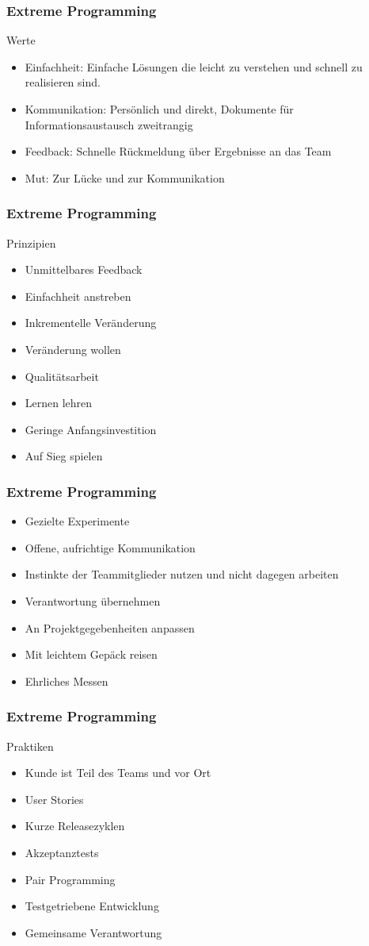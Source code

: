 \begin{frame}
\frametitle{Extreme Programming}
	Werte
	\begin{itemize}
		\item Einfachheit: Einfache Lösungen die leicht zu verstehen und schnell zu realisieren sind.
		\item Kommunikation: Persönlich und direkt, Dokumente für Informationsaustausch zweitrangig
		\item Feedback: Schnelle Rückmeldung über Ergebnisse an das Team
		\item Mut: Zur Lücke und zur Kommunikation
	\end{itemize}
\end{frame}

\begin{frame}
\frametitle{Extreme Programming}
	Prinzipien
	\begin{itemize}
		\item Unmittelbares Feedback
		\item Einfachheit anstreben
		\item Inkrementelle Veränderung
		\item Veränderung wollen
		\item Qualitätsarbeit
		\item Lernen lehren
		\item Geringe Anfangsinvestition
		\item Auf Sieg spielen
	\end{itemize}
\end{frame}

\begin{frame}
\frametitle{Extreme Programming}
	\begin{itemize}
		\item Gezielte Experimente
		\item Offene, aufrichtige Kommunikation
		\item Instinkte der Teammitglieder nutzen und nicht dagegen arbeiten
		\item Verantwortung übernehmen
		\item An Projektgegebenheiten anpassen
		\item Mit leichtem Gepäck reisen
		\item Ehrliches Messen
	\end{itemize}
\end{frame}

\begin{frame}
\frametitle{Extreme Programming}
	Praktiken
	\begin{itemize}
		\item Kunde ist Teil des Teams und vor Ort
		\item User Stories
		\item Kurze Releasezyklen
		\item Akzeptanztests
		\item Pair Programming
		\item Testgetriebene Entwicklung
		\item Gemeinsame Verantwortung
	\end{itemize}
\end{frame}

